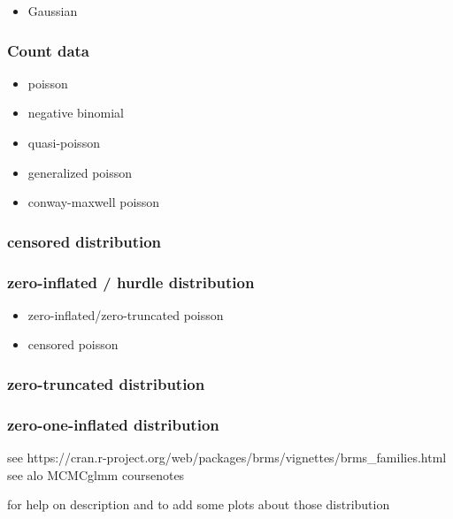 \documentclass[
  letterpaper,
  DIV=11,
  numbers=noendperiod]{scrreprt}
\providecommand{\tightlist}{%
  \setlength{\itemsep}{0pt}\setlength{\parskip}{0pt}}\usepackage{longtable,booktabs,array}
\begin{document}
\begin{itemize}
\tightlist
\item
  Gaussian
\end{itemize}

\subsubsection{Count data}\label{count-data}

\begin{itemize}
\tightlist
\item
  poisson
\item
  negative binomial
\item
  quasi-poisson
\item
  generalized poisson
\item
  conway-maxwell poisson
\end{itemize}

\subsubsection{censored distribution}\label{censored-distribution}

\subsubsection{zero-inflated / hurdle
distribution}\label{zero-inflated-hurdle-distribution}

\begin{itemize}
\tightlist
\item
  zero-inflated/zero-truncated poisson
\item
  censored poisson
\end{itemize}

\subsubsection{zero-truncated
distribution}\label{zero-truncated-distribution}

\subsubsection{zero-one-inflated
distribution}\label{zero-one-inflated-distribution}

see
https://cran.r-project.org/web/packages/brms/vignettes/brms\_families.html
see alo MCMCglmm coursenotes

for help on description and to add some plots about those distribution
\end{document}

